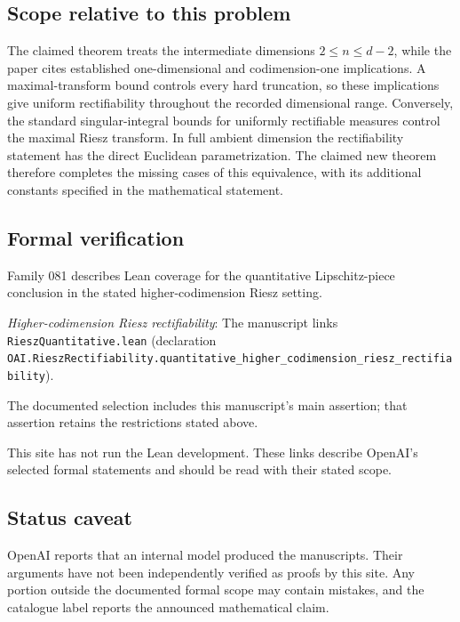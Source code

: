 \documentclass[11pt]{article}
\begin{document}
\subsection{Scope relative to this problem}
The claimed theorem treats the intermediate dimensions $2\le n\le d-2$, while the paper cites established one-dimensional and codimension-one implications. A maximal-transform bound controls every hard truncation, so these implications give uniform rectifiability throughout the recorded dimensional range. Conversely, the standard singular-integral bounds for uniformly rectifiable measures control the maximal Riesz transform. In full ambient dimension the rectifiability statement has the direct Euclidean parametrization. The claimed new theorem therefore completes the missing cases of this equivalence, with its additional constants specified in the mathematical statement.

\subsection{Formal verification}
Family 081 describes Lean coverage for the quantitative Lipschitz-piece conclusion in the stated higher-codimension Riesz setting.

\textit{Higher-codimension Riesz rectifiability}: The manuscript links \texttt{RieszQuantitative.lean} (declaration \texttt{OAI.RieszRectifiability.quantitative\_higher\_codimension\_riesz\_rectifiability}).

The documented selection includes this manuscript’s main assertion; that assertion retains the restrictions stated above.

This site has not run the Lean development. These links describe OpenAI’s selected formal statements and should be read with their stated scope.

\subsection{Status caveat}
OpenAI reports that an internal model produced the manuscripts. Their arguments have not been independently verified as proofs by this site. Any portion outside the documented formal scope may contain mistakes, and the catalogue label reports the announced mathematical claim.
\end{document}
